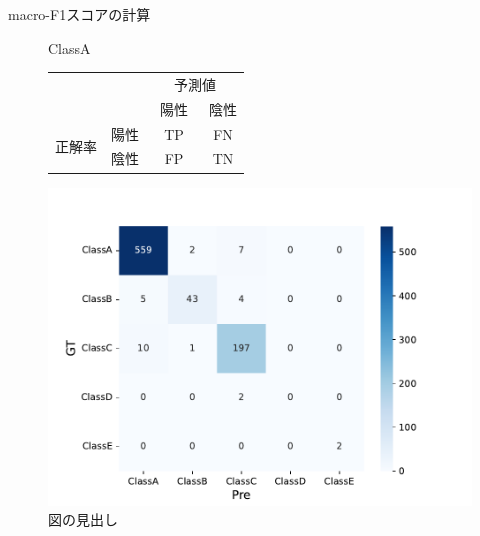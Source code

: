 \documentclass[leno,xcolor=dvipsnames]{beamer}
\makeatletter
\newcommand{\tblcaption}[1]{\def\@captype{table}\caption{#1}}
\makeatother
\begin{document}
  \begin{frame}{macro-F1スコアの計算}
    \begin{figure}[h]
      \def\@captype{table}
      \begin{minipage}[t]{.48\textwidth}
        \tblcaption{ClassA} \label{tb:ClassA}
        \begin{center}
          \begin{tabular}{cccc}
            \toprule
            \multicolumn{2}{c}{} & \multicolumn{2}{c}{予測値} \\ \cline{3-4}
            & & 陽性　& 陰性 \\
            \midrule
            \multirow{2}{*}{正解率} & 陽性 & TP & FN \\
            & 陰性 & FP & TN \\
            \bottomrule
          \end{tabular}
        \end{center}
      \end{minipage}
      \hfill
      \begin{minipage}[c]{.48\textwidth}
        \centering
        \includegraphics[keepaspectratio, scale=0.4]{images/deepimfam_confusion_matrix_cnt.pdf}
        \caption{図の見出し}
        \label{図へのラベル}
      \end{minipage}
    \end{figure}
  \end{frame}
\end{document}
